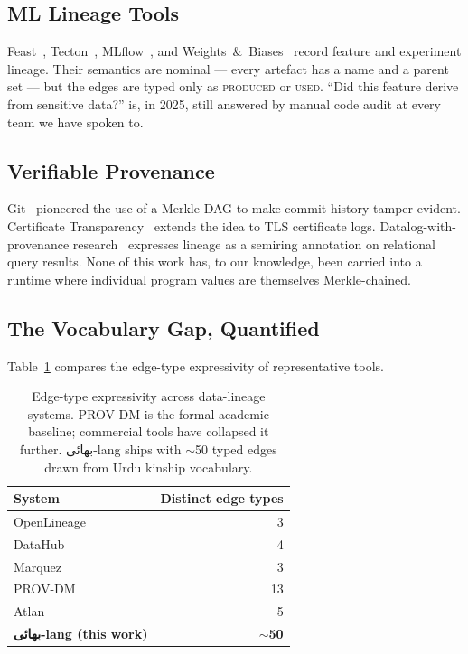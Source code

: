 \documentclass[10pt,twocolumn]{article}
\newcommand{\ur}[1]{{\urdufont #1}}
\begin{document}
\subsection{ML Lineage Tools}

Feast~\cite{feast}, Tecton~\cite{tecton}, MLflow~\cite{mlflow}, and Weights~\&~Biases~\cite{wandb} record feature and experiment lineage. Their semantics are nominal — every artefact has a name and a parent set — but the edges are typed only as \textsc{produced} or \textsc{used}. ``Did this feature derive from sensitive data?'' is, in 2025, still answered by manual code audit at every team we have spoken to.

\subsection{Verifiable Provenance}

Git~\cite{git} pioneered the use of a Merkle DAG to make commit history tamper-evident. Certificate Transparency~\cite{ct-rfc} extends the idea to TLS certificate logs. Datalog-with-provenance research~\cite{provenance-semirings} expresses lineage as a semiring annotation on relational query results. None of this work has, to our knowledge, been carried into a runtime where individual program values are themselves Merkle-chained.

\subsection{The Vocabulary Gap, Quantified}

Table~\ref{tab:vocab-gap} compares the edge-type expressivity of representative tools.

\begin{table}[h]
\centering
\small
\begin{tabular}{lr}
\hline
System & Distinct edge types \\
\hline
OpenLineage~\cite{openlineage} & 3 \\
DataHub~\cite{datahub} & 4 \\
Marquez~\cite{marquez} & 3 \\
PROV-DM~\cite{prov-dm} & 13 \\
Atlan~\cite{atlan} & 5 \\
\textbf{\ur{بھائی}-lang (this work)} & \textbf{$\sim$50} \\
\hline
\end{tabular}
\caption{Edge-type expressivity across data-lineage systems. PROV-DM is the formal academic baseline; commercial tools have collapsed it further. \ur{بھائی}-lang ships with $\sim$50 typed edges drawn from Urdu kinship vocabulary.}
\label{tab:vocab-gap}
\end{table}
\end{document}
